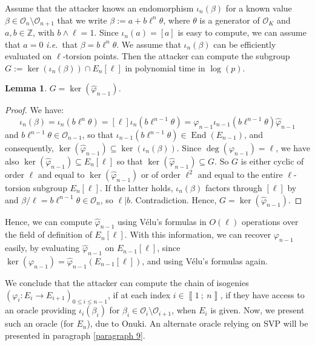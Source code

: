 \documentclass[a4paper,10pt]{report}
\theoremstyle{definition}
\theoremstyle{plain}
\newtheorem{lemma}[definition]{Lemma}
\theoremstyle{definition}
\newcommand{\ie}{\emph{i.e.}\ }
\newcommand{\Z}{\mathbb{Z}}
\newcommand{\mO}{\mathcal{O}}
\renewcommand{\i}[2]{\left\llbracket #1~;~#2\right\rrbracket}
\renewcommand{\(}{\left(}
\renewcommand{\)}{\right)}
\DeclareMathOperator{\End}{End}
\begin{document}
Assume that the attacker knows an endomorphism $\iota_n(\beta)$ for a known value $\beta\in\mO_n\setminus \mO_{n+1}$ that we write $\beta:=a+b\ell^n\theta$, where $\theta$ is a generator of $\mO_K$ and $a,b\in\Z$, with $b\wedge \ell=1$. Since $\iota_n(a)=[a]$ is easy to compute, we can assume that $a=0$ \ie that $\beta=b\ell^n\theta$. We assume that $\iota_n(\beta)$ can be efficiently evaluated on $\ell$-torsion points. Then the attacker can compute the subgroup $G:=\ker(\iota_n(\beta))\cap  E_n[\ell]$ in polynomial time in $\log(p)$. 

\begin{lemma}
$G=\ker(\widehat{\varphi}_{n-1})$.
\end{lemma}

\begin{proof}
We have:
\[\iota_n(\beta)=\iota_n(b\ell^n\theta)=[\ell]\iota_n(b\ell^{n-1}\theta)=\varphi_{n-1}\iota_{n-1}(b\ell^{n-1}\theta)\widehat{\varphi}_{n-1}\]
and $b\ell^{n-1}\theta\in\mO_{n-1}$, so that $\iota_{n-1}(b\ell^{n-1}\theta)\in\End(E_{n-1})$, and consequently, $\ker(\widehat{\varphi}_{n-1})\subseteq\ker(\iota_n(\beta))$. Since $\deg(\varphi_{n-1})=\ell$, we have also $\ker(\widehat{\varphi}_{n-1})\subseteq E_{n}[\ell]$ so that $\ker(\widehat{\varphi}_{n-1})\subseteq G$.  So $G$ is either cyclic of order $\ell$ and equal to $\ker(\widehat{\varphi}_{n-1})$ or of order $\ell^2$ and equal to the entire $\ell$-torsion subgroup $E_n[\ell]$. If the latter holds, $\iota_n(\beta)$ factors through $[\ell]$ by \cite[corollary III.4.11]{Silverman1} and $\beta/\ell=b\ell^{n-1}\theta\in\mO_n$, so $\ell|b$. Contradiction. Hence, $G=\ker(\widehat{\varphi}_{n-1})$.
\end{proof}

Hence, we can compute $\widehat{\varphi}_{n-1}$ using V\'{e}lu's formulas in $O(\ell)$ operations over the field of definition of $E_n[\ell]$. With this information, we can recover $\varphi_{n-1}$ easily, by evaluating $\widehat{\varphi}_{n-1}$ on $E_{n-1}[\ell]$, since $\ker(\varphi_{n-1})=\widehat{\varphi}_{n-1}(E_{n-1}[\ell])$, and using V\'{e}lu's formulas again.

We conclude that the attacker can compute the chain of isogenies $(\varphi_i : E_i\longrightarrow E_{i+1})_{0\leq i\leq n-1}$, if at each index $i\in\i{1}{n}$,  if they have access to an oracle providing $\iota_i(\beta_i)$ for $\beta_i\in\mO_i\setminus\mO_{i+1}$, when $E_{i}$ is given. Now, we present such an oracle (for $E_n$), due to Onuki. An alternate oracle relying on SVP will be presented in paragraph \ref{paragraph 9}.
\end{document}

